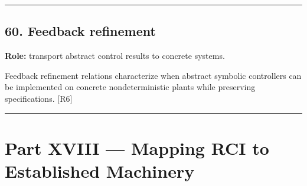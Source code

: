 \documentclass[
]{article}
\begin{document}
\begin{center}\rule{0.5\linewidth}{0.5pt}\end{center}

\subsection{60. Feedback refinement}\label{feedback-refinement}

\textbf{Role:} transport abstract control results to concrete systems.

Feedback refinement relations characterize when abstract symbolic
controllers can be implemented on concrete nondeterministic plants while
preserving specifications. {[}R6{]}

\begin{center}\rule{0.5\linewidth}{0.5pt}\end{center}

\section{Part XVIII --- Mapping RCI to Established
Machinery}\label{part-xviii-mapping-rci-to-established-machinery}
\end{document}
